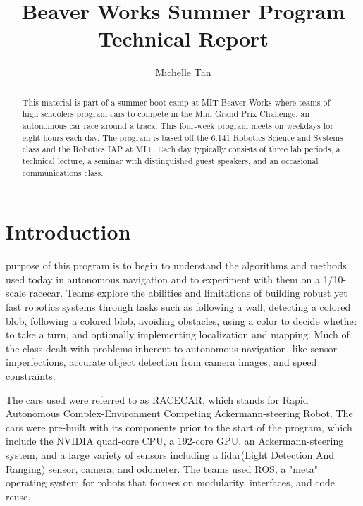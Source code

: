\documentclass[journal, a4paper]{IEEEtran}
\begin{document}
    \title{Beaver Works Summer Program Technical Report}
    \author{Michelle Tan}
    \maketitle

\begin{abstract}
    This material is part of a summer boot camp at MIT Beaver Works where teams of high schoolers program cars to compete in the Mini Grand Prix Challenge, an autonomous car race around a track. This four-week program meets on weekdays for eight hours each day. The program is based off the 6.141 Robotics Science and Systems class and the Robotics IAP at MIT. Each day typically consists of three lab periods, a technical lecture, a seminar with distinguished guest speakers, and an occasional communications class. 
\end{abstract}
\section{Introduction}
     purpose of this program is to begin to understand the algorithms and methods used today in autonomous navigation and to experiment with them on a 1/10-scale racecar. Teams explore the abilities and limitations of building robust yet fast robotics systems through tasks such as following a wall, detecting a colored blob, following a colored blob, avoiding obstacles, using a color to decide whether to take a turn, and optionally implementing localization and mapping. Much of the class dealt with problems inherent to autonomous navigation, like sensor imperfections, accurate object detection from camera images, and speed constraints. 
    \par The cars used were referred to as RACECAR, which stands for Rapid Autonomous Complex-Environment Competing Ackermann-steering Robot. The cars were pre-built with its components prior to the start of the program, which include the NVIDIA quad-core CPU, a 192-core GPU, an Ackermann-steering system, and a large variety of sensors including a lidar(Light Detection And Ranging) sensor, camera, and odometer. The teams used ROS, a "meta" operating system for robots that focuses on modularity, interfaces, and code reuse. \cite{plecture2} 
\end{document}
